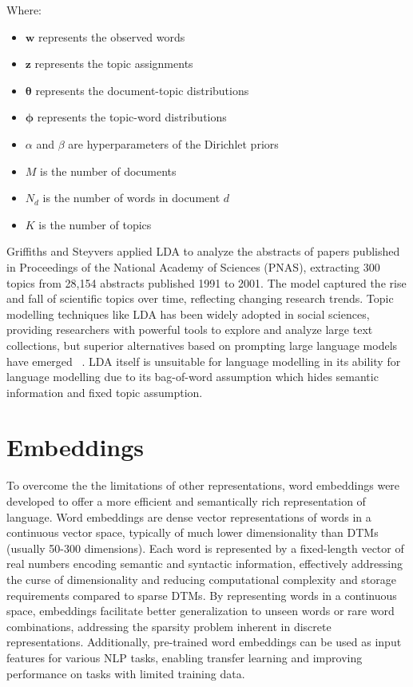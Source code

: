 \documentclass[a4paper, oneside]{discothesis}
\begin{document}
Where:
\begin{itemize}
    \item $\mathbf{w}$ represents the observed words
    \item $\mathbf{z}$ represents the topic assignments
    \item $\boldsymbol{\theta}$ represents the document-topic distributions
    \item $\boldsymbol{\phi}$ represents the topic-word distributions
    \item $\alpha$ and $\beta$ are hyperparameters of the Dirichlet priors
    \item $M$ is the number of documents
    \item $N_d$ is the number of words in document $d$
    \item $K$ is the number of topics
\end{itemize}

Griffiths and Steyvers \cite{griffiths2004finding} applied LDA to analyze the abstracts of papers published in Proceedings of the National Academy of Sciences (PNAS), 
extracting 300 topics from 28,154 abstracts published 1991 to 2001. The model captured the rise and fall of scientific topics over time, reflecting changing research trends.
Topic modelling techniques like LDA has been widely adopted in social sciences, providing researchers with powerful tools to explore and analyze large text collections, 
but superior alternatives based on prompting large language models have emerged ~\cite{WangPrakashPromptTopic}. LDA itself is unsuitable for language modelling  in its
ability for language modelling due to its bag-of-word assumption which hides semantic information and fixed topic assumption.  

\section{Embeddings}

To overcome the the limitations of other representations, word embeddings were developed to offer a more efficient and semantically rich representation of language. Word embeddings are dense vector representations of words in a continuous vector space, typically of much lower dimensionality than DTMs (usually 50-300 dimensions). Each word is represented by a fixed-length vector of real numbers encoding semantic and syntactic information, effectively addressing the curse of dimensionality and reducing computational complexity and storage requirements compared to sparse DTMs. By representing words in a continuous space, embeddings facilitate better generalization to unseen words or rare word combinations, addressing the sparsity problem inherent in discrete representations. Additionally, pre-trained word 
embeddings can be used as input features for various NLP tasks, enabling transfer learning and improving performance on tasks with limited training data. 
\end{document}
